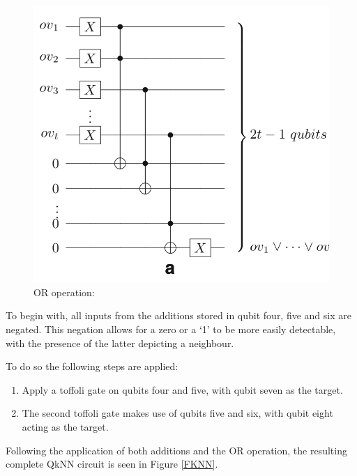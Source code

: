 \begin{figure}[H]
      \centering
      \includegraphics[scale=0.65]{background/KayeOR.png}
      \caption{OR operation: \citep{Kaye}}
      \label{QORFol}
\end{figure}

To begin with, all inputs from the additions stored in qubit four, five and six are negated. This negation allows for a zero or a ‘1’ to be more easily detectable, with the presence of the latter depicting a neighbour.
 
To do so the following steps are applied:
\begin{enumerate}

\item Apply a toffoli gate on qubits four and five, with qubit seven as the target.
\vspace{0.3cm}

\item The second toffoli gate makes use of qubits five and six, with qubit eight acting as the target.
\vspace{0.3cm}
\end{enumerate}

Following the application of both additions and the OR operation, the resulting complete QkNN circuit is seen in Figure \ref{FKNN}.





